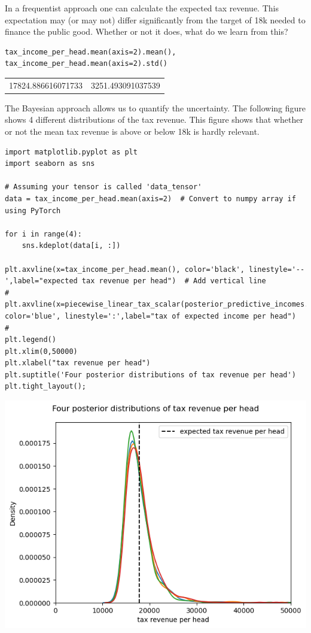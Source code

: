 \documentclass[11pt]{article}
\begin{document}
In a frequentist approach one can calculate the expected tax revenue. This expectation may (or may not) differ significantly from the target of 18k needed to finance the public good. Whether or not it does, what do we learn from this?

\begin{verbatim}
tax_income_per_head.mean(axis=2).mean(), tax_income_per_head.mean(axis=2).std()
\end{verbatim}

\begin{table}[htbp]
\label{}
\centering
\begin{tabular}{rr}
17824.886616071733 & 3251.493091037539\\
\end{tabular}
\end{table}

The Bayesian approach allows us to quantify the uncertainty. The following figure shows 4 different distributions of the tax revenue. This figure shows that whether or not the mean tax revenue is above or below 18k is hardly relevant.

\begin{verbatim}
import matplotlib.pyplot as plt
import seaborn as sns

# Assuming your tensor is called 'data_tensor'
data = tax_income_per_head.mean(axis=2)  # Convert to numpy array if using PyTorch

for i in range(4):
    sns.kdeplot(data[i, :])

plt.axvline(x=tax_income_per_head.mean(), color='black', linestyle='--',label="expected tax revenue per head")  # Add vertical line
# plt.axvline(x=piecewise_linear_tax_scalar(posterior_predictive_incomes.mean(),thresholds,rates), color='blue', linestyle=':',label="tax of expected income per head")  # 
plt.legend()
plt.xlim(0,50000)
plt.xlabel("tax revenue per head")
plt.suptitle('Four posterior distributions of tax revenue per head')
plt.tight_layout();

\end{verbatim}

\begin{center}
\includegraphics[width=.9\linewidth]{./figures/average_tax_income_distributions.png}
\label{}
\end{center}
\end{document}
